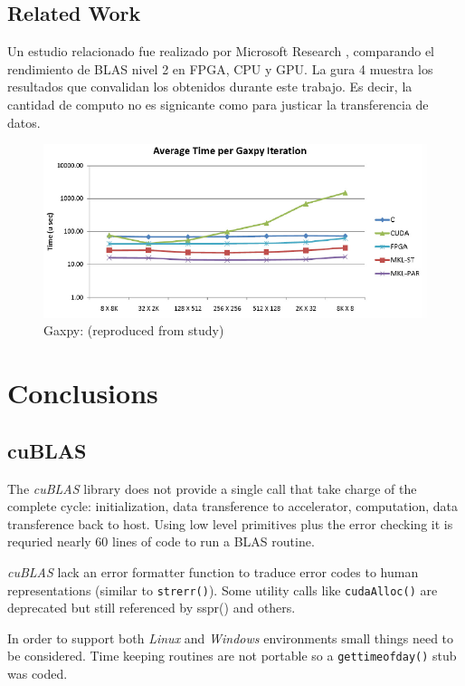 \documentclass{llncs}
\begin{document}
\subsection{Related Work}

Un estudio relacionado fue realizado por Microsoft Research \cite{ms-gaxpy}, comparando el rendimiento de BLAS nivel 2 en FPGA,
CPU y GPU. 
La gura 4 muestra los resultados que convalidan los obtenidos durante este trabajo. 
Es decir, la cantidad de computo no es signicante como para justicar la transferencia de datos.

\begin{figure}
\begin{center}
\includegraphics[width=\textwidth]{gaxpy.png}
\caption{Gaxpy: (reproduced from study)}
\label{fig:gaxpy}
\end{center}
\end{figure}

\section{Conclusions}

\subsection{cuBLAS}

The {\it cuBLAS} library does not provide a single call that take charge of the complete cycle:
initialization, data transference to accelerator, computation, data transference back to host.
Using low level primitives plus the error checking it is requried nearly 60 lines of code to run a BLAS routine.

{\it cuBLAS} lack an error formatter function to traduce error codes to human representations (similar to {\tt strerr()}). Some utility calls like {\tt cudaAlloc()} are deprecated but still referenced by sspr() and others.

In order to support both {\it Linux} and {\it Windows} environments small things need to be considered. 
Time keeping routines are not portable so a {\tt gettimeofday()} stub was coded.
\end{document}
